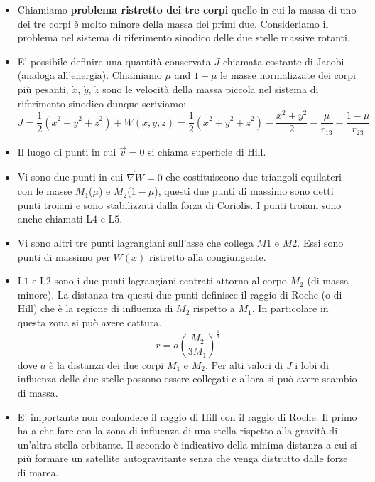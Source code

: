 \documentclass[11pt,a4paper]{article}
\begin{document}
\begin{itemize}
\item Chiamiamo \textbf{problema ristretto dei tre corpi} quello in cui la massa di uno dei tre corpi è molto minore della massa dei primi due. Consideriamo il problema nel sistema di riferimento sinodico delle due stelle massive rotanti.

\item E' possibile definire una quantità conservata $J$ chiamata costante di Jacobi (analoga all'energia). Chiamiamo $\mu$ and $1-\mu$ le masse normalizzate dei corpi più pesanti, $\dot{x}$, $\dot{y}$, $\dot{z}$ sono le velocità della massa piccola nel sistema di riferimento sinodico dunque scriviamo:
\begin{equation}
J = \frac{1}{2} \left( \dot{x}^2 + \dot{y}^2 + \dot{z}^2 \right) + W(x, y, z) = \frac{1}{2} \left( \dot{x}^2 + \dot{y}^2 + \dot{z}^2 \right) -\frac{x^2+y^2}{2} -\frac{\mu }{r_{13}} - \frac{1-\mu }{r_{23}}
\end{equation}

\item Il luogo di punti in cui $\vec{v} = 0$ si chiama superficie di Hill.

\item Vi sono due punti in cui $\vec{\nabla} W = 0$ che costituiscono due triangoli equilateri con le masse $M_1$($\mu$) e $M_2$($1-\mu$), questi due punti di massimo sono detti punti troiani e sono stabilizzati dalla forza di Coriolis. I punti troiani sono anche chiamati L$4$ e L$5$. 

\item Vi sono altri tre punti lagrangiani sull'asse che collega $M1$ e $M2$. Essi sono punti di massimo per $W(x)$ ristretto alla congiungente. 

\item L$1$ e L$2$ sono i due punti lagrangiani centrati attorno al corpo $M_2$ (di massa minore). La distanza tra questi due punti definisce il raggio di Roche (o di Hill) che è la regione di influenza di $M_2$ rispetto a $M_1$. In particolare in questa zona si può avere cattura.
\begin{equation}
r = a \left( \frac{M_2}{3 M_1} \right)^{\frac{1}{3}}
\end{equation}
dove $a$ è la distanza dei due corpi $M_1$ e $M_2$. Per alti valori di $J$ i lobi di influenza delle due stelle possono essere collegati e allora si può avere scambio di massa.

\item E' importante non confondere il raggio di Hill con il raggio di Roche. Il primo ha a che fare con la zona di influenza di una stella rispetto alla gravità di un'altra stella orbitante. Il secondo è indicativo della minima distanza a cui si più formare un satellite autogravitante senza che venga distrutto dalle forze di marea.


\end{itemize}
\end{document}
